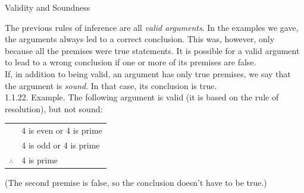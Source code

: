 \documentclass[smaller,hyperref={CJKbookmarks=true}]{beamer}
\begin{document}
\begin{frame}[t]{Validity and Soundness}
\begin{spacing}{1.05}
The previous rules of inference are all \emph{valid arguments}. In the examples we
gave, the arguments always led to a correct conclusion. This was, however,
only because all the premises were true statements. It is possible for a
valid argument to lead to a wrong conclusion if one or more of its premises
are false.\\[5pt]
If, in addition to being valid, an argument has only true premises, we say
that the argument is \emph{sound}. In that case, its conclusion is true.\\[5pt]
\alert{1.1.22. Example.} The following argument is valid (it is based on the rule of resolution), but not sound:
\begin{center}
  \begin{tabular}{cl}
    & 4 is even or 4 is prime \\
    & 4 is odd or 4 is prime \\ \cmidrule{2-2}
   $\therefore$ & 4 is prime \\
 \end{tabular}
\end{center}
(The second premise is false, so the conclusion doesn't have to be true.)
\end{spacing}
\end{frame}
\end{document}
